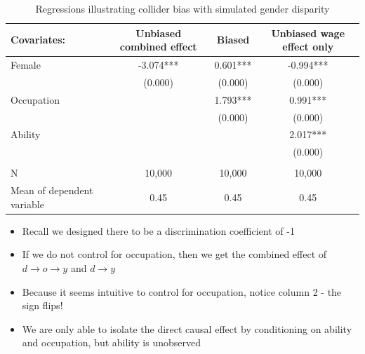 \documentclass{beamer}
\begin{document}
\begin{frame}[plain, shrink=20]

  \begin{table}[htbp]\centering
    \scriptsize
    \caption{Regressions illustrating collider bias with simulated gender disparity}
    \begin{center}
      \begin{tabular}{l*{3}{c}}
        \toprule
        \multicolumn{1}{l}{Covariates: }&
        \multicolumn{1}{c}{\textbf{Unbiased combined effect}}&
        \multicolumn{1}{c}{\textbf{Biased }}&
        \multicolumn{1}{c}{\textbf{Unbiased wage effect only}}\\
        \midrule
        Female                     & -3.074*** & 0.601*** & -0.994*** \\
                                   & (0.000)   & (0.000)  & (0.000)   \\
        Occupation                 &           & 1.793*** & 0.991***  \\
                                   &           & (0.000)  & (0.000)   \\
        Ability                    &           &          & 2.017***  \\
                                   &           &          & (0.000)   \\
        \\
        \midrule
        N                          & 10,000    & 10,000   & 10,000    \\
        Mean of dependent variable & 0.45      & 0.45     & 0.45      \\
        \bottomrule
      \end{tabular}
    \end{center}
  \end{table}

  \begin{itemize}
    \item Recall we designed there to be a discrimination coefficient of -1
    \item If we do not control for occupation, then we get the combined effect of $d \rightarrow o \rightarrow y$ and $d  \rightarrow y$
    \item Because it seems intuitive to control for occupation, notice column 2 - the sign flips!
    \item We are only able to isolate the direct causal effect by conditioning on ability and occupation, but ability is unobserved
  \end{itemize}

\end{frame}
\end{document}
